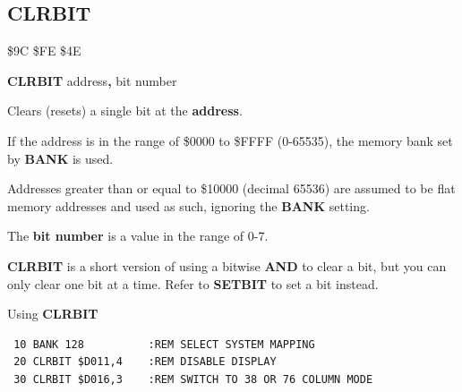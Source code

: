 \subsection{CLRBIT}
\begin{description}[leftmargin=2cm,style=nextline]
\item [Token:] \$9C \$FE \$4E
\item [Format:] {\bf CLRBIT} address{\bf,} bit number
\item [Usage:]  Clears (resets) a single bit at the {\bf address}.

                If the address is in the range of \$0000 to \$FFFF (0-65535), the
                memory bank set by {\bf BANK} is used.

                Addresses greater than or equal to \$10000 (decimal 65536)
                are assumed to be flat memory
                addresses and used as such, ignoring the {\bf BANK} setting.

                The {\bf bit number} is a value in the range of 0-7.

\item [Remarks:] {\bf CLRBIT} is a short version of using a bitwise {\bf AND} to clear a bit,
                 but you can only clear one bit at a time. Refer to {\bf SETBIT} to set a bit instead.

\item [Example:] Using {\bf CLRBIT}

\begin{tcolorbox}[colback=black,coltext=white]
\verbatimfont{\codefont}
\begin{verbatim}
 10 BANK 128          :REM SELECT SYSTEM MAPPING
 20 CLRBIT $D011,4    :REM DISABLE DISPLAY
 30 CLRBIT $D016,3    :REM SWITCH TO 38 OR 76 COLUMN MODE
\end{verbatim}
\end{tcolorbox}
\end{description}


\newpage
